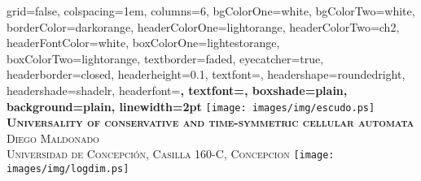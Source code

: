 \documentclass[10pt,portrait,final,a1paper,fontscale=0.51]{baposter}
\begin{document}



\renewcommand{\refname}{} 
\begin{poster}%
  {
  grid=false,
  colspacing=1em,
  columns=6,
  bgColorOne=white,
  bgColorTwo=white,
  borderColor=darkorange,
  headerColorOne=lightorange,
  headerColorTwo=ch2,
  headerFontColor=white,
  boxColorOne=lightestorange,
  boxColorTwo=lightorange,
  textborder=faded,
  eyecatcher=true,
  headerborder=closed,
  headerheight=0.1\textheight,
  textfont=\sc,%
  headershape=roundedright,
  headershade=shadelr,
  headerfont=\Large\bf\textsc, %
  textfont={\setlength{\parindent}{1.5em}},
  boxshade=plain,
  background=plain,
  linewidth=2pt
  }
  {\texttt{[image: images/img/escudo.ps]}}  
  {\bf\textsc{Universality of conservative and time-symmetric cellular automata}\vspace{0.25em}}
  {\small{\textsc{Diego Maldonado \\ Universidad de Concepci\'on, Casilla 160-C, Concepcion}}}
  {%
    {\texttt{[image: images/img/logdim.ps]}}  
  }


\end{poster}
\end{document}
